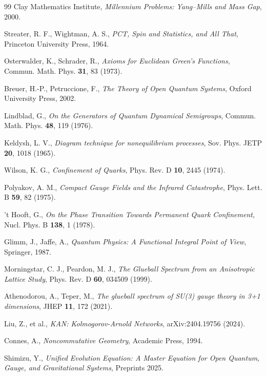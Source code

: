 \documentclass[aps,prd,reprint,superscriptaddress,floatfix]{revtex4-2}
\begin{document}
\begin{thebibliography}{99}
Clay Mathematics Institute, \emph{Millennium Problems: Yang--Mills and Mass Gap}, 2000.

Streater, R. F., Wightman, A. S., \emph{PCT, Spin and Statistics, and All That}, Princeton University Press, 1964.

Osterwalder, K., Schrader, R., \emph{Axioms for Euclidean Green's Functions}, Commun. Math. Phys. \textbf{31}, 83 (1973).

Breuer, H.-P., Petruccione, F., \emph{The Theory of Open Quantum Systems}, Oxford University Press, 2002.

Lindblad, G., \emph{On the Generators of Quantum Dynamical Semigroups}, Commun. Math. Phys. \textbf{48}, 119 (1976).

Keldysh, L. V., \emph{Diagram technique for nonequilibrium processes}, Sov. Phys. JETP \textbf{20}, 1018 (1965).

Wilson, K. G., \emph{Confinement of Quarks}, Phys. Rev. D \textbf{10}, 2445 (1974).

Polyakov, A. M., \emph{Compact Gauge Fields and the Infrared Catastrophe}, Phys. Lett. B \textbf{59}, 82 (1975).

't Hooft, G., \emph{On the Phase Transition Towards Permanent Quark Confinement}, Nucl. Phys. B \textbf{138}, 1 (1978).

Glimm, J., Jaffe, A., \emph{Quantum Physics: A Functional Integral Point of View}, Springer, 1987.

Morningstar, C. J., Peardon, M. J., \emph{The Glueball Spectrum from an Anisotropic Lattice Study}, Phys. Rev. D \textbf{60}, 034509 (1999).

Athenodorou, A., Teper, M., \emph{The glueball spectrum of SU(3) gauge theory in 3+1 dimensions}, JHEP \textbf{11}, 172 (2021).

Liu, Z., et al., \emph{KAN: Kolmogorov-Arnold Networks}, arXiv:2404.19756 (2024).

Connes, A., \emph{Noncommutative Geometry}, Academic Press, 1994.

Shimizu, Y., \emph{Unified Evolution Equation: A Master Equation for Open Quantum, Gauge, and Gravitational Systems}, Preprints 2025.


\end{thebibliography}
\end{document}
